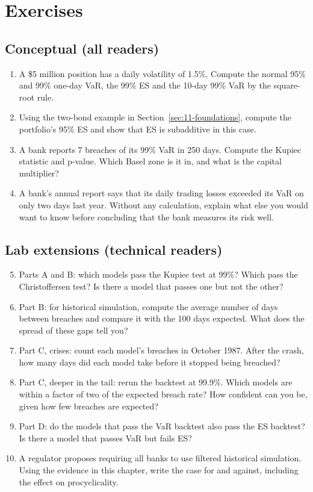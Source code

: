 \section*{Exercises}

\subsection*{Conceptual (all readers)}

\begin{enumerate}
  \item A \$5 million position has a daily volatility of 1.5\%. Compute the normal 95\% and 99\% one-day VaR, the 99\% ES and the 10-day 99\% VaR by the square-root rule.
  \item Using the two-bond example in Section~\ref{sec:11-foundations}, compute the portfolio's 95\% ES and show that ES is subadditive in this case.
  \item A bank reports 7 breaches of its 99\% VaR in 250 days. Compute the Kupiec statistic and p-value. Which Basel zone is it in, and what is the capital multiplier?
  \item A bank's annual report says that its daily trading losses exceeded its VaR on only two days last year. Without any calculation, explain what else you would want to know before concluding that the bank measures its risk well.
\end{enumerate}

\subsection*{Lab extensions (technical readers)}

\begin{enumerate}
  \setcounter{enumi}{4}
  \item Parts A and B: which models pass the Kupiec test at 99\%? Which pass the Christoffersen test? Is there a model that passes one but not the other?
  \item Part B: for historical simulation, compute the average number of days between breaches and compare it with the 100 days expected. What does the spread of these gaps tell you?
  \item Part C, crises: count each model's breaches in October 1987. After the crash, how many days did each model take before it stopped being breached?
  \item Part C, deeper in the tail: rerun the backtest at 99.9\%. Which models are within a factor of two of the expected breach rate? How confident can you be, given how few breaches are expected?
  \item Part D: do the models that pass the VaR backtest also pass the ES backtest? Is there a model that passes VaR but fails ES?
  \item A regulator proposes requiring all banks to use filtered historical simulation. Using the evidence in this chapter, write the case for and against, including the effect on procyclicality.
\end{enumerate}